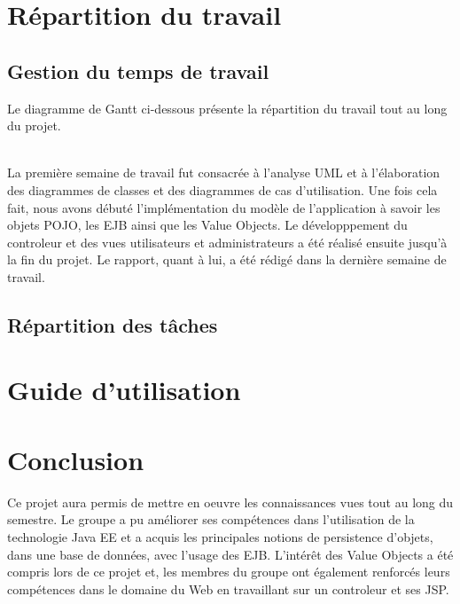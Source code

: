 \documentclass[10pt]{report}
\begin{document}
\newpage
\chapter{Répartition du travail}
\section{Gestion du temps de travail}

Le diagramme de Gantt ci-dessous présente la répartition du travail tout au long du projet.
\\
	\begin{figure}[hp]
	      \begin{center}
	      \end{center}
	\end{figure}
\\

La première semaine de travail fut consacrée à l'analyse UML et à l'élaboration des diagrammes de classes et des diagrammes de cas d'utilisation. Une fois cela fait, nous avons débuté l'implémentation du modèle de l'application à savoir les objets POJO, les EJB ainsi que les Value Objects. Le développpement du controleur et des vues utilisateurs et administrateurs a été réalisé ensuite jusqu'à la fin du projet. Le rapport, quant à lui, a été rédigé dans la dernière semaine de travail.

\section{Répartition des tâches}

\chapter{Guide d'utilisation}

\chapter*{Conclusion}

Ce projet aura permis de mettre en oeuvre les connaissances vues tout au long du semestre. Le groupe a pu améliorer ses compétences dans l'utilisation de la technologie Java EE et a acquis les principales notions de persistence d'objets, dans une base de données, avec l'usage des EJB. L'intérêt des Value Objects a été compris lors de ce projet et, les membres du groupe ont également renforcés leurs compétences dans le domaine du Web en travaillant sur un controleur et ses JSP. 
\end{document}
